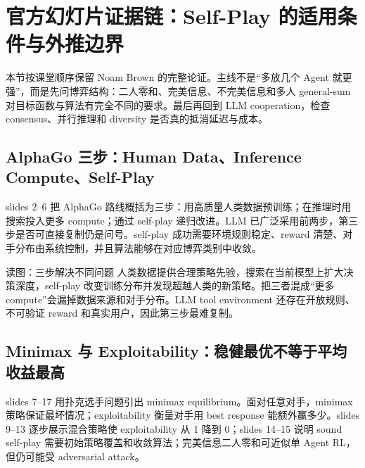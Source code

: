 \section{官方幻灯片证据链：Self-Play 的适用条件与外推边界}

本节按课堂顺序保留 Noam Brown 的完整论证。主线不是“多放几个 Agent 就更强”，而是先问博弈结构：二人零和、完美信息、不完美信息和多人 general-sum 对目标函数与算法有完全不同的要求。最后再回到 LLM cooperation，检查 consensus、并行推理和 diversity 是否真的抵消延迟与成本。

\subsection{AlphaGo 三步：Human Data、Inference Compute、Self-Play}

slides 2--6 把 AlphaGo 路线概括为三步：用高质量人类数据预训练；在推理时用搜索投入更多 compute；通过 self-play 递归改进。LLM 已广泛采用前两步，第三步是否可直接复制仍是问号。self-play 成功需要环境规则稳定、reward 清楚、对手分布由系统控制，并且算法能够在对应博弈类别中收敛。


\begin{knowledgebox}{读图：三步解决不同问题}
人类数据提供合理策略先验，搜索在当前模型上扩大决策深度，self-play 改变训练分布并发现超越人类的新策略。把三者混成“更多 compute”会漏掉数据来源和对手分布。LLM tool environment 还存在开放规则、不可验证 reward 和真实用户，因此第三步最难复制。
\end{knowledgebox}

\subsection{Minimax 与 Exploitability：稳健最优不等于平均收益最高}

slides 7--17 用扑克选手问题引出 minimax equilibrium。面对任意对手，minimax 策略保证最坏情况；exploitability 衡量对手用 best response 能额外赢多少。slides 9--13 逐步展示混合策略使 exploitability 从 1 降到 0；slides 14--15 说明 sound self-play 需要初始策略覆盖和收敛算法；完美信息二人零和可近似单 Agent RL，但仍可能受 adversarial attack。

